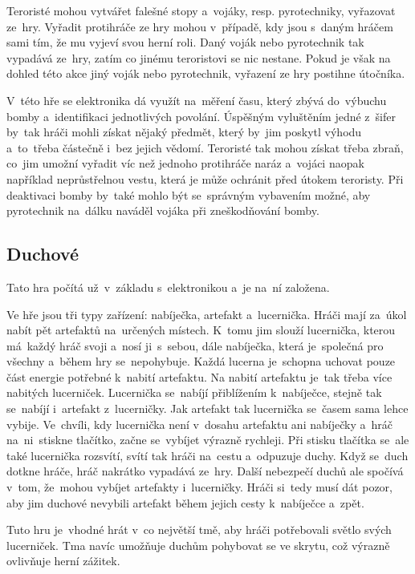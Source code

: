Teroristé mohou vytvářet falešné stopy a~vojáky, resp. pyrotechniky, vyřazovat ze~hry.
Vyřadit protihráče ze hry mohou v~případě, kdy jsou s~daným hráčem sami tím, že mu vyjeví svou herní roli.
Daný voják nebo pyrotechnik tak vypadává ze~hry, zatím co jinému teroristovi se nic nestane.
Pokud je však na dohled této akce jiný voják nebo pyrotechnik, vyřazení ze hry postihne útočníka.

V~této hře se elektronika dá využít na~měření času, který zbývá do~výbuchu bomby a~identifikaci jednotlivých povolání.
Úspěšným vyluštěním jedné z~šifer by~tak hráči mohli získat nějaký předmět, který by~jim poskytl výhodu a~to~třeba částečně i~bez jejich vědomí.
Teroristé tak mohou získat třeba zbraň, co~jim umožní vyřadit víc než jednoho protihráče naráz a~vojáci naopak například neprůstřelnou vestu, která je může ochránit před útokem teroristy.
Při deaktivaci bomby by~také mohlo být se~správným vybavením možné, aby pyrotechnik na~dálku naváděl vojáka při zneškodňování bomby.

\vspace{-2mm}
\subsection{Duchové}
Tato hra počítá už~v~základu s~elektronikou a~je na~ní založena.

Ve hře jsou tři typy zařízení: nabíječka, artefakt a~lucernička.
Hráči mají za~úkol nabít pět artefaktů na~určených místech.
K~tomu jim slouží lucernička, kterou má~každý hráč svoji a~nosí ji~s~sebou, dále nabíječka, která je~společná pro všechny a~během hry se~nepohybuje.
Každá lucerna je~schopna uchovat pouze část energie potřebné k~nabití artefaktu. 
Na nabití artefaktu je~tak třeba více nabitých lucerniček.
Lucernička se~nabíjí přiblížením k~nabíječce, stejně tak se~nabíjí i~artefakt z~lucerničky.
Jak artefakt tak lucernička se~časem sama lehce vybije.
Ve~chvíli, kdy lucernička není v~dosahu artefaktu ani nabíječky a~hráč na~ni~stiskne tlačítko, začne se~vybíjet výrazně rychleji.
Při stisku tlačítka se~ale také lucernička rozsvítí, svítí tak hráči na~cestu a~odpuzuje duchy.
Když se~duch dotkne hráče, hráč nakrátko vypadává ze~hry.
Další nebezpečí duchů ale spočívá v~tom, že~mohou vybíjet artefakty i~lucerničky.
Hráči si~tedy musí dát pozor, aby jim duchové nevybili artefakt během jejich cesty k~nabíječce a~zpět.


Tuto hru je~vhodné hrát v~co největší tmě, aby hráči potřebovali světlo svých lucerniček.
Tma navíc umožňuje duchům pohybovat se ve skrytu, což výrazně ovlivňuje herní zážitek.